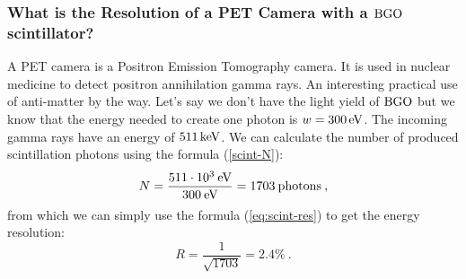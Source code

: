 \documentclass[10pt, titlepage, a4paper]{article}
\numberwithin{equation}{section}
\begin{document}
\subsubsection{What is the Resolution of a PET Camera with a $\rm{BGO}$ scintillator?}
A PET camera is a Positron Emission Tomography camera. It is used in nuclear medicine to detect positron annihilation gamma rays. An interesting 
practical use of anti-matter by the way. Let's say we don't have the light yield of $\rm{BGO}$ but we know that the energy needed to create one photon
is $w=300\,\rm{eV}$. The incoming gamma rays have an energy of $511\,\rm{keV}$. We can calculate the number of produced scintillation photons 
using the formula (\ref{scint-N}):
%
\begin{equation}
    N = \frac{511\cdot10^{3}\>\rm{eV}}{300\>\rm{eV}} = 1703\>\rm{photons}\>,
\end{equation}
%
from which we can simply use the formula (\ref{eq:scint-res}) to get the energy resolution:
%
\begin{equation}
    R = \frac{1}{\sqrt{1703}} = 2.4\%\>.
\end{equation}
\end{document}
